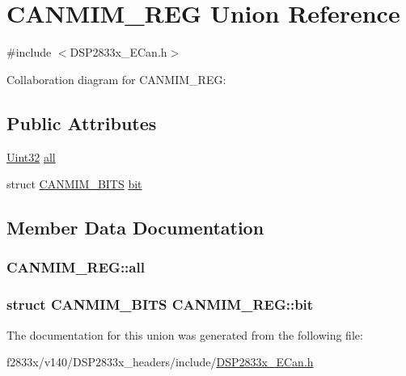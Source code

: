 \hypertarget{union_c_a_n_m_i_m___r_e_g}{}\section{C\+A\+N\+M\+I\+M\+\_\+\+R\+E\+G Union Reference}
\label{union_c_a_n_m_i_m___r_e_g}


{\ttfamily \#include $<$D\+S\+P2833x\+\_\+\+E\+Can.\+h$>$}



Collaboration diagram for C\+A\+N\+M\+I\+M\+\_\+\+R\+E\+G\+:
\subsection*{Public Attributes}
\begin{DoxyCompactItemize}
\item 
\hyperlink{_d_s_p2833x___device_8h_aba99025e657f892beb7ff31cecf64653}{Uint32} \hyperlink{union_c_a_n_m_i_m___r_e_g_a8692c49a6f13dde3850b06336e44517a}{all}
\item 
struct \hyperlink{struct_c_a_n_m_i_m___b_i_t_s}{C\+A\+N\+M\+I\+M\+\_\+\+B\+I\+T\+S} \hyperlink{union_c_a_n_m_i_m___r_e_g_aa5477a42f890a70e4b4f0e548b34d251}{bit}
\end{DoxyCompactItemize}


\subsection{Member Data Documentation}
\hypertarget{union_c_a_n_m_i_m___r_e_g_a8692c49a6f13dde3850b06336e44517a}{}
\subsubsection[{all}]{ C\+A\+N\+M\+I\+M\+\_\+\+R\+E\+G\+::all}\label{union_c_a_n_m_i_m___r_e_g_a8692c49a6f13dde3850b06336e44517a}
\hypertarget{union_c_a_n_m_i_m___r_e_g_aa5477a42f890a70e4b4f0e548b34d251}{}
\subsubsection[{bit}]{\setlength{\rightskip}{0pt plus 5cm}struct {\bf C\+A\+N\+M\+I\+M\+\_\+\+B\+I\+T\+S} C\+A\+N\+M\+I\+M\+\_\+\+R\+E\+G\+::bit}\label{union_c_a_n_m_i_m___r_e_g_aa5477a42f890a70e4b4f0e548b34d251}


The documentation for this union was generated from the following file\+:\begin{DoxyCompactItemize}
\item 
f2833x/v140/\+D\+S\+P2833x\+\_\+headers/include/\hyperlink{_d_s_p2833x___e_can_8h}{D\+S\+P2833x\+\_\+\+E\+Can.\+h}\end{DoxyCompactItemize}
